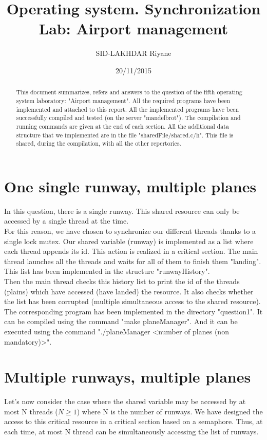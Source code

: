 \documentclass[a4paper]{article}
\title{Operating system. Synchronization Lab: Airport management}
\author{SID-LAKHDAR Riyane}
\date{20/11/2015}
\begin{document}
\maketitle

\begin{abstract}
	This document summarizes, refers and answers to the question of the fifth operating system laboratory: "Airport management".   All the required programs have been implemented and attached to this report.   All the implemented programs have been successfully compiled and tested (on the server "mandelbrot").   The compilation and running commands are given at the end of each section.   All the additional data structure that we implemented are in the file "sharedFile/shared.c/h".   This file is shared, during the compilation, with all the other repertories.
\end{abstract}


\section{One single runway, multiple planes}
In this question, there is a single runway.   This shared resource	 can only be accessed by a single thread at the time.\\
For this reason, we have chosen to synchronize our different threads thanks to a single lock mutex.  Our shared variable (runway) is implemented as a list where each thread appends its id.   This action is realized in a critical section.   The main thread launches all the threads and waits for all of them to finish them "landing".   This list has been implemented in the structure "runwayHistory".\\
Then the main thread checks this history list to print the id of the threads (plains) which have accessed (have landed) the resource.   It also checks whether the list has been corrupted (multiple simultaneous access to the shared resource).\\

The corresponding program has been implemented in the directory "question1".   It can be compiled using the command "make planeManager".   And it can be executed using the command "./planeManager <number of planes (non mandatory)>".

\section{Multiple runways, multiple planes}
Let's now consider the case where the shared variable may be accessed by at most N threads ($N \geq 1$) where N is the number of runways.   We have designed the access to this critical resource in a critical section based on a semaphore.   Thus, at each time, at most N thread can be simultaneously accessing the list of runways.\\
\end{document}
